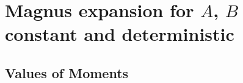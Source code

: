 \section{Magnus expansion for $A$, $B$ constant and deterministic}
\subsection{Values of Moments}
	
